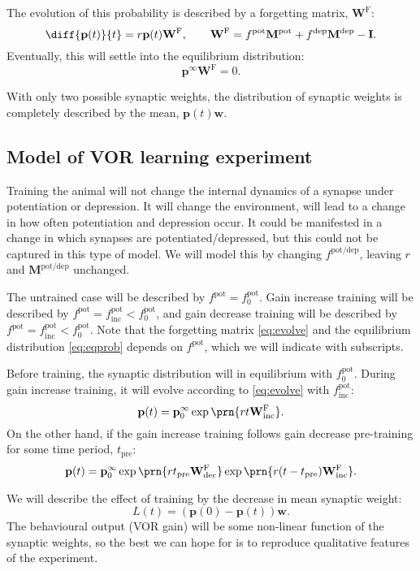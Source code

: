 \documentclass[12pt]{article}
\newcommand{\I}{\mathbf{I}}
\newcommand{\pr}{\mathbf{p}}
\newcommand{\eq}{\pr^\infty}
\newcommand{\w}{\mathbf{w}}
\newcommand{\W}{\mathbf{W}}
\newcommand{\frg}{\W^\mathrm{F}}
\newcommand{\M}{\mathbf{M}}
\newcommand{\pot}{^{\text{pot}}}
\newcommand{\dep}{^{\text{dep}}}
\newcommand{\potdep}{^{\text{pot/dep}}}
\newcommand{\inc}{_{\text{inc}}}
\newcommand{\dec}{_{\text{dec}}}
\newcommand{\tpre}{t_{\text{pre}}}
\begin{document}
The evolution of this probability is described by a forgetting matrix, $\frg$:
%
\begin{equation}\label{eq:evolve}
  \diff{\pr(t)}{t} = r\pr(t)\frg,
  \qquad
  \frg = f\pot\M\pot+f\dep\M\dep-\I.
\end{equation}
%
Eventually, this will settle into the equilibrium distribution:
%
\begin{equation}\label{eq:eqprob}
  \eq\frg=0.
\end{equation}
%



With only two possible synaptic weights, the distribution of synaptic weights is completely described by the mean, $\pr(t)\w$.


\subsection{Model of VOR learning experiment}\label{sec:learning}

Training the animal will not change the internal dynamics of a synapse under potentiation or depression.
It will change the environment, will lead to a change in how often potentiation and depression occur.
It could be manifested in a change in which synapses are potentiated/depressed, but this could not be captured in this type of model.
We will model this by changing $f\potdep$, leaving $r$ and $\M\potdep$ unchanged.

The untrained case will be described by $f\pot=f\pot_0$.
Gain increase training  will be described by $f\pot=f\pot\inc<f\pot_0$, and
gain decrease training  will be described by $f\pot=f\pot\inc<f\pot_0$. Note that the forgetting matrix \eqref{eq:evolve} and the equilibrium distribution \eqref{eq:eqprob} depends on $f\pot$, which we will indicate with subscripts.

Before training, the synaptic distribution will in equilibrium with $f\pot_0$.
During gain increase training, it will evolve according to \eqref{eq:evolve} with $f\pot\inc$:
%
\begin{equation}\label{eq:nopre}
  \pr(t) = \eq_0 \exp\prn{rt\frg\inc}.
\end{equation}
%
On the other hand, if the gain increase training follows gain decrease pre-training for some time period, $\tpre$:
%
\begin{equation}\label{eq:withpre}
  \pr(t) = \eq_0 \exp\prn{r\tpre\frg\dec} \exp\prn{r(t-\tpre)\frg\inc}.
\end{equation}
%

We will describe the effect of training by the decrease in mean synaptic weight:
%
\begin{equation}\label{eq:learning}
  L(t) = (\pr(0)-\pr(t))\w.
\end{equation}
%
The behavioural output (VOR gain) will be some non-linear function of the synaptic weights, so the best we can hope for is to reproduce qualitative features of the experiment.
\end{document}
